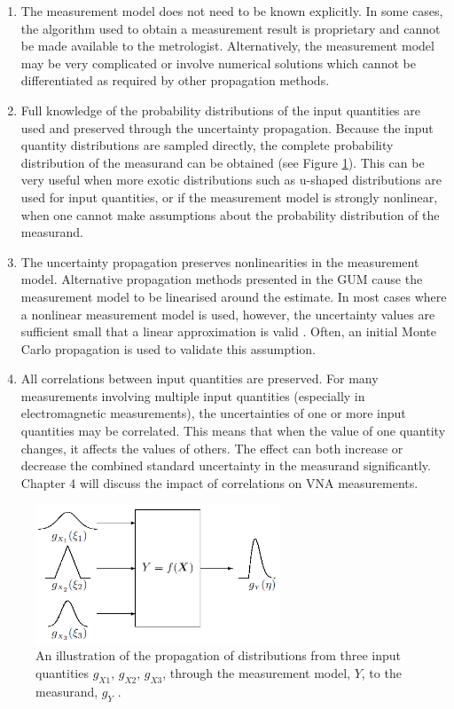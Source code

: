 \documentclass[../thesis/thesis.tex]{subfiles}
\begin{document}
\begin{refsection}
\begin{enumerate}
	\item The measurement model does not need to be known explicitly. In some cases, the algorithm used to obtain a measurement result is proprietary and cannot be made available to the metrologist. Alternatively, the measurement model may be very complicated or involve numerical solutions which cannot be differentiated as required by other propagation methods.
	\item Full knowledge of the probability distributions of the input quantities are used and preserved through the uncertainty propagation. Because the input quantity distributions are sampled directly, the complete probability distribution of the measurand can be obtained (see Figure \ref{ch3_fig_distributions}). This can be very useful when more exotic distributions such as u-shaped distributions are used for input quantities, or if the measurement model is strongly nonlinear, when one cannot make assumptions about the probability distribution of the measurand.
	\item The uncertainty propagation preserves nonlinearities in the measurement model. Alternative propagation methods presented in the GUM cause the measurement model to be linearised around the estimate. In most cases where a nonlinear measurement model is used, however, the uncertainty values are sufficient small that a linear approximation is valid \cite[5.1.5]{GUM_2008}. Often, an initial Monte Carlo propagation is used to validate this assumption.
	\item All correlations between input quantities are preserved. For many measurements involving multiple input quantities (especially in electromagnetic measurements), the uncertainties of one or more input quantities may be correlated. This means that when the value of one quantity changes, it affects the values of others. The effect can both increase or decrease the combined standard uncertainty in the measurand significantly. Chapter 4 will discuss the impact of correlations on VNA measurements.
\end{enumerate}

\begin{figure}
	\centering
	\includegraphics[width=0.65\textwidth]{distributions}
	\caption{An illustration of the propagation of distributions from three input quantities $g_{X1}$, $g_{X2}$, $g_{X3}$, through the measurement model, $Y$, to the measurand, $g_{Y}$ \cite{GUM_S1}.}
	\label{ch3_fig_distributions}
\end{figure}


\end{refsection}
\end{document}
